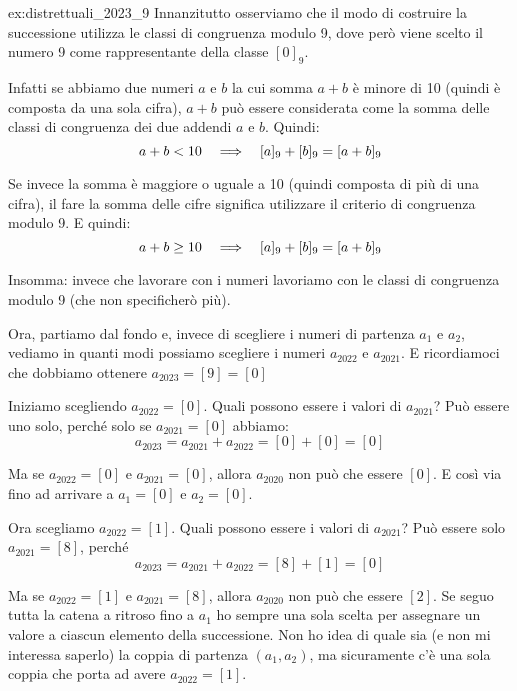\begin{soluzione}{ex:distrettuali_2023_9}
    Innanzitutto osserviamo che il modo di costruire la successione utilizza le classi di congruenza modulo 9, dove
    però viene scelto il numero 9 come rappresentante della classe $[0]_9$.

    Infatti se abbiamo due numeri $a$ e $b$ la cui somma $a+b$ è minore di 10 (quindi è composta da una sola cifra),
    $a+b$ può essere considerata come la somma delle classi di congruenza dei due addendi $a$ e $b$.
    Quindi:
    \begin{equation*}
        a + b < 10  \quad\Longrightarrow\quad  [a]_9 + [b]_9 = [a+b]_9
    \end{equation*}

    Se invece la somma è maggiore o uguale a 10 (quindi composta di più di una cifra), il fare la somma delle cifre
    significa utilizzare il criterio di congruenza modulo 9.
    E quindi:
    \begin{equation*}
        a + b \ge 10  \quad\Longrightarrow\quad  [a]_9 + [b]_9 = [a+b]_9
    \end{equation*}

    Insomma: invece che lavorare con i numeri lavoriamo con le classi di congruenza modulo 9 (che non specificherò più).

    Ora, partiamo dal fondo e, invece di scegliere i numeri di partenza $a_1$ e $a_2$, vediamo in quanti modi possiamo
    scegliere i numeri $a_{2022}$ e $a_{2021}$.
    E ricordiamoci che dobbiamo ottenere $a_{2023} = [9] = [0]$

    Iniziamo scegliendo $a_{2022} = [0]$.
    Quali possono essere i valori di $a_{2021}$?
    Può essere uno solo, perché solo se $a_{2021} = [0]$ abbiamo:
    \begin{equation*}
        a_{2023} = a_{2021} + a_{2022} = [0] + [0] = [0]
    \end{equation*}

    Ma se $a_{2022} = [0]$ e $a_{2021} = [0]$, allora $a_{2020}$ non può che essere $[0]$.
    E così via fino ad arrivare a $a_1 = [0]$ e $a_2 = [0]$.

    Ora scegliamo $a_{2022} = [1]$.
    Quali possono essere i valori di $a_{2021}$?
    Può essere solo $a_{2021} = [8]$, perché
    \begin{equation*}
        a_{2023} = a_{2021} + a_{2022} = [8] + [1] = [0]
    \end{equation*}

    Ma se $a_{2022} = [1]$ e $a_{2021} = [8]$, allora $a_{2020}$ non può che essere $[2]$.
    Se seguo tutta la catena a ritroso fino a $a_1$ ho sempre una sola scelta per assegnare un valore a ciascun elemento
    della successione.
    Non ho idea di quale sia (e non mi interessa saperlo) la coppia di partenza $(a_1, a_2)$, ma sicuramente c'è una sola
    coppia che porta ad avere $a_{2022} = [1]$.


\end{soluzione}
